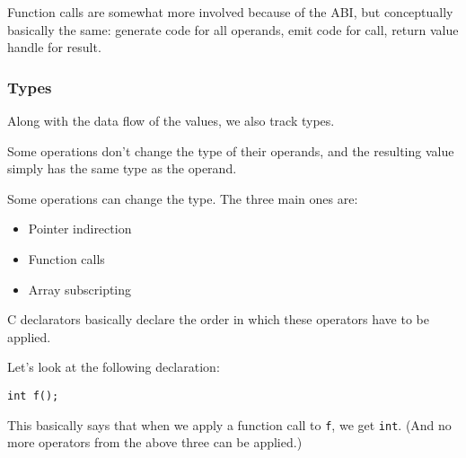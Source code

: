 \documentclass[12pt]{article}
\begin{document}
Function calls are somewhat more involved because of the ABI, but conceptually
basically the same: generate code for all operands, emit code for call, return
value handle for result.


\subsubsection{Types}
\label{sec:types}
Along with the data flow of the values, we also track types.

Some operations don't change the type of their operands, and the resulting
value simply has the same type as the operand.

Some operations can change the type. The three main ones are:
\begin{itemize}
	\item Pointer indirection
	\item Function calls
	\item Array subscripting
\end{itemize}

C declarators basically declare the order in which these operators have to be
applied.

Let's look at the following declaration:
\begin{center}
\begin{BVerbatim}
int f();
\end{BVerbatim}
\end{center}
This basically says that when we apply a function call to \texttt{f}, we get
\texttt{int}. (And no more operators from the above three can be applied.)
\end{document}
